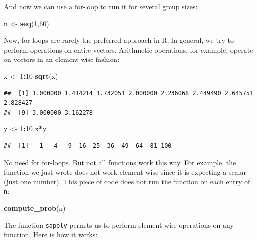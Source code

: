 \documentclass[
  openany]{book}
\newenvironment{Shaded}{\begin{snugshade}}{\end{snugshade}}
\newcommand{\DecValTok}[1]{\textcolor[rgb]{0.00,0.00,0.81}{#1}}
\newcommand{\KeywordTok}[1]{\textcolor[rgb]{0.13,0.29,0.53}{\textbf{#1}}}
\newcommand{\NormalTok}[1]{#1}
\newcommand{\OperatorTok}[1]{\textcolor[rgb]{0.81,0.36,0.00}{\textbf{#1}}}
\newcommand{\StringTok}[1]{\textcolor[rgb]{0.31,0.60,0.02}{#1}}
\begin{document}
And now we can use a for-loop to run it for several group sizes:

\begin{Shaded}
\begin{Highlighting}[]
\NormalTok{n <-}\StringTok{ }\KeywordTok{seq}\NormalTok{(}\DecValTok{1}\NormalTok{,}\DecValTok{60}\NormalTok{)}
\end{Highlighting}
\end{Shaded}

Now, for-loops are rarely the preferred approach in R. In general, we try to perform operations on entire vectors. Arithmetic operations, for example, operate on vectors in an element-wise fashion:

\begin{Shaded}
\begin{Highlighting}[]
\NormalTok{x <-}\StringTok{ }\DecValTok{1}\OperatorTok{:}\DecValTok{10}
\KeywordTok{sqrt}\NormalTok{(x)}
\end{Highlighting}
\end{Shaded}

\begin{verbatim}
##  [1] 1.000000 1.414214 1.732051 2.000000 2.236068 2.449490 2.645751 2.828427
##  [9] 3.000000 3.162278
\end{verbatim}

\begin{Shaded}
\begin{Highlighting}[]
\NormalTok{y <-}\StringTok{ }\DecValTok{1}\OperatorTok{:}\DecValTok{10}
\NormalTok{x}\OperatorTok{*}\NormalTok{y}
\end{Highlighting}
\end{Shaded}

\begin{verbatim}
##  [1]   1   4   9  16  25  36  49  64  81 100
\end{verbatim}

No need for for-loops. But not all functions work this way. For example, the function we just wrote does not work element-wise since it is expecting a scalar (just one number). This piece of code does not run the function on each entry of \texttt{n}:

\begin{Shaded}
\begin{Highlighting}[]
\KeywordTok{compute_prob}\NormalTok{(n)}
\end{Highlighting}
\end{Shaded}

The function \texttt{sapply} permits us to perform element-wise operations on any function. Here is how it works:
\end{document}
